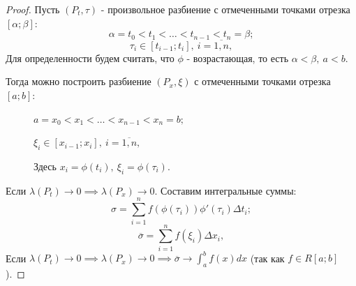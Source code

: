 \documentclass{report}
\theoremstyle{definition}
\begin{document}
\begin{proof}
  Пусть $(P_t,\tau)$ - произвольное разбиение с отмеченными точками отрезка $[\alpha;\beta]:$
  \begin{equation*}
    \alpha = t_0 < t_1 < \ldots < t_{n-1} < t_n = \beta;
  \end{equation*}
  \begin{equation*}
    \tau_i \in [t_{i-1};t_i], \ i = \overline{1,n},
  \end{equation*}
  Для определенности будем считать, что $\phi$ - возрастающая, то есть $\alpha < \beta, \ a < b$.

  \clearpage

  Тогда можно построить разбиение $(P_x,\xi)$ с отмеченными точками отрезка $[a;b]:$
  \begin{figure}[h]
    \begin{minipage}[h]{0.49\linewidth}
    \end{minipage}
    \hfill
    \begin{minipage}[h]{0.49\linewidth}
      $a = x_0 < x_1 < \ldots < x_{n-1} < x_n = b;$

      $\xi_i \in [x_{i-1};x_i], \ i = \overline{1,n},$

      Здесь $x_i = \phi(t_i), \ \xi_i = \phi(\tau_i)$.
    \end{minipage}
  \end{figure}

  Если $\lambda(P_t)\rightarrow0 \implies \lambda(P_x)\rightarrow0$. Составим интегральные суммы:
  \begin{equation*}
    \sigma = \sum_{i=1}^{n}f(\phi(\tau_i))\phi'(\tau_i)\Delta t_i;
  \end{equation*}
  \begin{equation*}
    \overline{\sigma} = \sum_{i=1}^{n}f(\xi_i)\Delta x_i,
  \end{equation*}
  Если $\lambda(P_t)\rightarrow0 \implies \lambda(P_x) \rightarrow 0 \implies \overline{\sigma}
    \rightarrow \int_{a}^{b}f(x)dx$ (так как $f\in R[a;b]$).


\end{proof}
\end{document}
